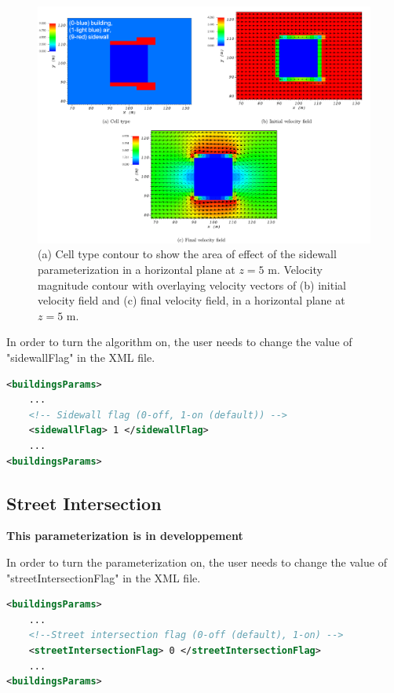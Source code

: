 \begin{figure}[H]
    \includegraphics[width=\textwidth]{Images/sidewall_z_5_1.pdf}
    \caption{(a) Cell type contour to show the area of effect of the sidewall parameterization in a horizontal plane at $z=5$ m. Velocity magnitude contour with overlaying velocity vectors of (b) initial velocity field and (c) final velocity field, in a horizontal plane at $z=5$ m.}
\end{figure}

In order to turn the algorithm on, the user needs to change the value of "sidewallFlag" in the XML file.

\begin{lstlisting}[language=XML]
<buildingsParams>
	...
	<!-- Sidewall flag (0-off, 1-on (default)) -->
	<sidewallFlag> 1 </sidewallFlag>
	... 				
<buildingsParams>
\end{lstlisting}

\subsection{Street Intersection}

\textbf{This parameterization is in developpement}

In order to turn the parameterization on, the user needs to change the value of "streetIntersectionFlag" in the XML file.

\begin{lstlisting}[language=XML]
<buildingsParams>
	...
	<!--Street intersection flag (0-off (default), 1-on) -->		
    <streetIntersectionFlag> 0 </streetIntersectionFlag>
	... 				
<buildingsParams>
\end{lstlisting}

